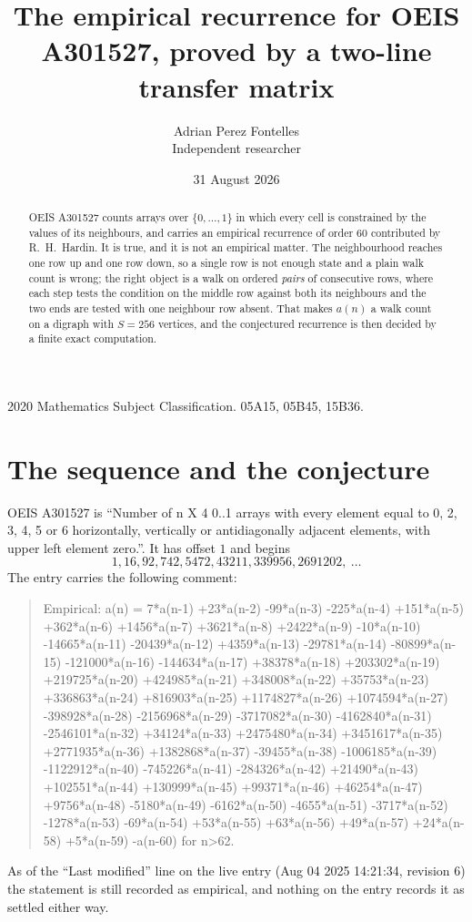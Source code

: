 \documentclass[11pt,a4paper]{article}
\title{The empirical recurrence for OEIS A301527, proved by a two-line transfer matrix}
\author{Adrian Perez Fontelles\\ \small Independent researcher}
\date{31 August 2026}
\theoremstyle{plain}
\theoremstyle{definition}
\begin{document}
\maketitle

\begin{abstract}
OEIS A301527 counts arrays over $\{0,\dots,1\}$ in which every cell is constrained by the
values of its neighbours, and carries an empirical recurrence of order $60$ contributed
by R.~H.~Hardin. It is true, and it is not an empirical matter. The neighbourhood reaches one
row up and one row down, so a single row is not enough state and a plain walk count
is wrong; the right object is a walk on ordered \emph{pairs} of consecutive rows, where
each step tests the condition on the middle row against both its neighbours and the two
ends are tested with one neighbour row absent. That makes $a(n)$ a walk count on a digraph
with $S=256$ vertices, and the conjectured recurrence is then decided by a finite exact
computation.
\end{abstract}

\noindent\small 2020 Mathematics Subject Classification. 05A15, 05B45, 15B36.\normalsize

\section{The sequence and the conjecture}

OEIS A301527 is ``Number of n X 4 0..1 arrays with every element equal to 0, 2, 3, 4, 5 or 6 horizontally, vertically or antidiagonally adjacent elements, with upper left element zero.''. It has offset $1$ and begins
\[
1, 16, 92, 742, 5472, 43211, 339956, 2691202,\ \dots
\]
The entry carries the following comment:
\begin{quote}\small
Empirical: a(n) = 7*a(n-1) +23*a(n-2) -99*a(n-3) -225*a(n-4) +151*a(n-5) +362*a(n-6) +1456*a(n-7) +3621*a(n-8) +2422*a(n-9) -10*a(n-10) -14665*a(n-11) -20439*a(n-12) +4359*a(n-13) -29781*a(n-14) -80899*a(n-15) -121000*a(n-16) -144634*a(n-17) +38378*a(n-18) +203302*a(n-19) +219725*a(n-20) +424985*a(n-21) +348008*a(n-22) +35753*a(n-23) +336863*a(n-24) +816903*a(n-25) +1174827*a(n-26) +1074594*a(n-27) -398928*a(n-28) -2156968*a(n-29) -3717082*a(n-30) -4162840*a(n-31) -2546101*a(n-32) +34124*a(n-33) +2475480*a(n-34) +3451617*a(n-35) +2771935*a(n-36) +1382868*a(n-37) -39455*a(n-38) -1006185*a(n-39) -1122912*a(n-40) -745226*a(n-41) -284326*a(n-42) +21490*a(n-43) +102551*a(n-44) +130999*a(n-45) +99371*a(n-46) +46254*a(n-47) +9756*a(n-48) -5180*a(n-49) -6162*a(n-50) -4655*a(n-51) -3717*a(n-52) -1278*a(n-53) -69*a(n-54) +53*a(n-55) +63*a(n-56) +49*a(n-57) +24*a(n-58) +5*a(n-59) -a(n-60) for n>62.
\end{quote}
As of the ``Last modified'' line on the live entry (Aug 04 2025 14:21:34, revision 6) the statement is
still recorded as empirical, and nothing on the entry records it as settled either way.
\end{document}
